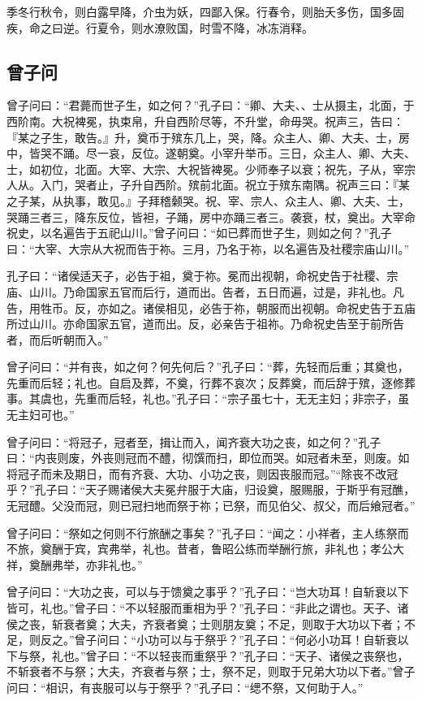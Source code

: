 \documentclass[]{article}
\begin{document}
季冬行秋令，则白露早降，介虫为妖，四鄙入保。行春令，则胎夭多伤，国多固疾，命之曰逆。行夏令，则水潦败国，时雪不降，冰冻消释。

\hypertarget{header-n367}{%
\subsection{曾子问}\label{header-n367}}

曾子问曰：``君薨而世子生，如之何？''孔子曰：``卿、大夫、、士从摄主，北面，于西阶南。大祝裨冕，执束帛，升自西阶尽等，不升堂，命毋哭。祝声三，告曰：『某之子生，敢告。』升，奠币于殡东几上，哭，降。众主人、卿、大夫、士，房中，皆哭不踊。尽一哀，反位。遂朝奠。小宰升举币。三日，众主人、卿、大夫、士，如初位，北面。大宰、大宗、大祝皆裨冕。少师奉子以衰；祝先，子从，宰宗人从。入门，哭者止，子升自西阶。殡前北面。祝立于殡东南隅。祝声三曰：『某之子某，从执事，敢见。』子拜稽颡哭。祝、宰、宗人、众主人、卿、大夫、士，哭踊三者三，降东反位，皆袒，子踊，房中亦踊三者三。袭衰，杖，奠出。大宰命祝史，以名遍告于五祀山川。''曾子问曰：``如已葬而世子生，则如之何？''孔子曰：``大宰、大宗从大祝而告于祢。三月，乃名于祢，以名遍告及社稷宗庙山川。''

孔子曰：``诸侯适天子，必告于祖，奠于祢。冕而出视朝，命祝史告于社稷、宗庙、山川。乃命国家五官而后行，道而出。告者，五日而遍，过是，非礼也。凡告，用牲币。反，亦如之。诸侯相见，必告于祢，朝服而出视朝。命祝史告于五庙所过山川。亦命国家五官，道而出。反，必亲告于祖祢。乃命祝史告至于前所告者，而后听朝而入。''

曾子问曰：``并有丧，如之何？何先何后？''孔子曰：``葬，先轻而后重；其奠也，先重而后轻；礼也。自启及葬，不奠，行葬不哀次；反葬奠，而后辞于殡，逐修葬事。其虞也，先重而后轻，礼也。''孔子曰：``宗子虽七十，无无主妇；非宗子，虽无主妇可也。''

曾子问曰：``将冠子，冠者至，揖让而入，闻齐衰大功之丧，如之何？''孔子曰：``内丧则废，外丧则冠而不醴，彻馔而扫，即位而哭。如冠者未至，则废。如将冠子而未及期日，而有齐衰、大功、小功之丧，则因丧服而冠。''``除丧不改冠乎？''孔子曰：``天子赐诸侯大夫冕弁服于大庙，归设奠，服赐服，于斯乎有冠醮，无冠醴。父没而冠，则已冠扫地而祭于祢；已祭，而见伯父、叔父，而后飨冠者。''

曾子问曰：``祭如之何则不行旅酬之事矣？''孔子曰：``闻之：小祥者，主人练祭而不旅，奠酬于宾，宾弗举，礼也。昔者，鲁昭公练而举酬行旅，非礼也；孝公大祥，奠酬弗举，亦非礼也。''

曾子问曰：``大功之丧，可以与于馈奠之事乎？''孔子曰：``岂大功耳！自斩衰以下皆可，礼也。''曾子曰：``不以轻服而重相为乎？''孔子曰：``非此之谓也。天子、诸侯之丧，斩衰者奠；大夫，齐衰者奠；士则朋友奠；不足，则取于大功以下者；不足，则反之。''曾子问曰：``小功可以与于祭乎？''孔子曰：``何必小功耳！自斩衰以下与祭，礼也。''曾子曰：``不以轻丧而重祭乎？''孔子曰：``天子、诸侯之丧祭也，不斩衰者不与祭；大夫，齐衰者与祭；士，祭不足，则取于兄弟大功以下者。''曾子问曰：``相识，有丧服可以与于祭乎？''孔子曰：``缌不祭，又何助于人。''
\end{document}
